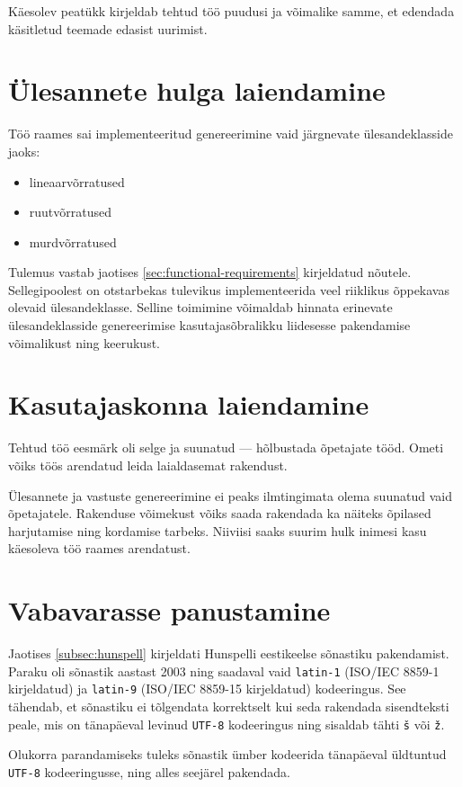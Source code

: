 Käesolev peatükk kirjeldab tehtud töö puudusi ja võimalike samme, et edendada käsitletud teemade edasist uurimist.

\section{Ülesannete hulga laiendamine}

Töö raames sai implementeeritud genereerimine vaid järgnevate ülesandeklasside jaoks:

\begin{itemize}
  \item lineaarvõrratused
  \item ruutvõrratused
  \item murdvõrratused
\end{itemize}

Tulemus vastab jaotises \ref{sec:functional-requirements} kirjeldatud nõutele. Sellegipoolest on otstarbekas tulevikus implementeerida veel riiklikus õppekavas olevaid ülesandeklasse. Selline toimimine võimaldab hinnata erinevate ülesandeklasside genereerimise kasutajasõbralikku liidesesse pakendamise võimalikust ning keerukust.

\section{Kasutajaskonna laiendamine}

Tehtud töö eesmärk oli selge ja suunatud — hõlbustada õpetajate tööd. Ometi võiks töös arendatud leida laialdasemat rakendust.

Ülesannete ja vastuste genereerimine ei peaks ilmtingimata olema suunatud vaid õpetajatele. Rakenduse võimekust võiks saada rakendada ka näiteks õpilased harjutamise ning kordamise tarbeks. Niiviisi saaks suurim hulk inimesi kasu käesoleva töö raames arendatust.

\section{Vabavarasse panustamine}

Jaotises \ref{subsec:hunspell} kirjeldati Hunspelli eestikeelse sõnastiku pakendamist. Paraku oli sõnastik aastast 2003 ning saadaval vaid \texttt{latin-1} (ISO/IEC 8859-1 kirjeldatud) ja \texttt{latin-9} (ISO/IEC 8859-15 kirjeldatud) kodeeringus. See tähendab, et sõnastiku ei tõlgendata korrektselt kui seda rakendada sisendteksti peale, mis on tänapäeval levinud \texttt{UTF-8} kodeeringus ning sisaldab tähti \texttt{š} või \texttt{ž}.

Olukorra parandamiseks tuleks sõnastik ümber kodeerida tänapäeval üldtuntud \texttt{UTF-8} kodeeringusse, ning alles seejärel pakendada.

